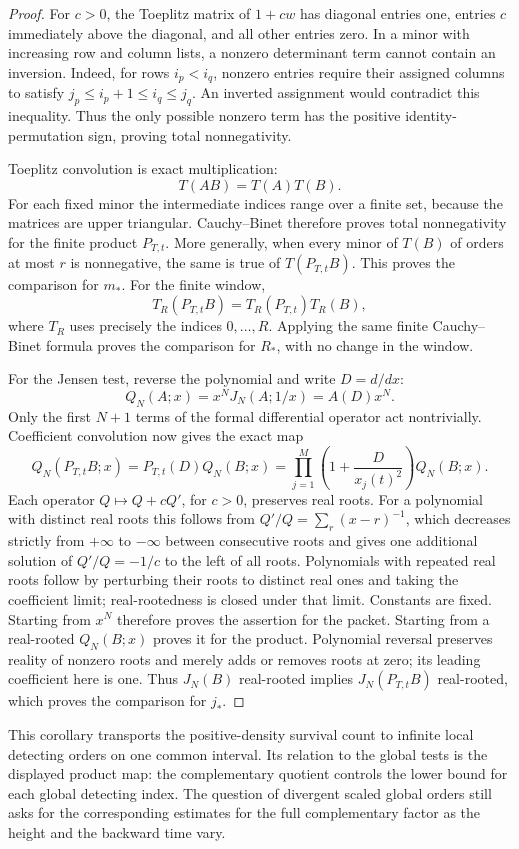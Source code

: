 \begin{proof}
For \(c>0\), the Toeplitz matrix of \(1+cw\) has diagonal entries
one, entries \(c\) immediately above the diagonal, and all other
entries zero. In a minor with increasing row and column lists, a
nonzero determinant term cannot contain an inversion. Indeed, for
rows \(i_p<i_q\), nonzero entries require their assigned columns to
satisfy \(j_p\le i_p+1\le i_q\le j_q\). An inverted assignment
would contradict this inequality. Thus the only possible nonzero
term has the positive identity-permutation sign, proving total
nonnegativity.

Toeplitz convolution is exact multiplication:
\[
 T(AB)=T(A)T(B).
\]
For each fixed minor the intermediate indices range over a finite
set, because the matrices are upper triangular. Cauchy--Binet
therefore proves total nonnegativity for the finite product
\(P_{T,t}\). More generally, when every minor of \(T(B)\) of orders
at most \(r\) is nonnegative, the same is true of \(T(P_{T,t}B)\).
This proves the comparison for \(m_*\). For the finite window,
\[
 T_R(P_{T,t}B)=T_R(P_{T,t})T_R(B),
\]
where \(T_R\) uses precisely the indices \(0,\ldots,R\).
Applying the same finite Cauchy--Binet formula proves the comparison
for \(R_*\), with no change in the window.

For the Jensen test, reverse the polynomial and write \(D=d/dx\):
\[
 Q_N(A;x)=x^N J_N(A;1/x)=A(D)x^N.
\]
Only the first \(N+1\) terms of the formal differential operator
act nontrivially. Coefficient convolution now gives the exact map
\[
 Q_N(P_{T,t}B;x)
   =P_{T,t}(D)Q_N(B;x)
   =\prod_{j=1}^{M}\left(1+\frac{D}{x_j(t)^2}\right)Q_N(B;x).
\]
Each operator \(Q\mapsto Q+cQ'\), for \(c>0\), preserves real
roots. For a polynomial with distinct real roots this follows from
\(Q'/Q=\sum_r(x-r)^{-1}\), which decreases strictly from
\(+\infty\) to \(-\infty\) between consecutive roots and gives
one additional solution of \(Q'/Q=-1/c\) to the left of all roots.
Polynomials with repeated real roots follow by perturbing their
roots to distinct real ones and taking the coefficient limit;
real-rootedness is closed under that limit. Constants are fixed.
Starting from \(x^N\) therefore proves the assertion for the packet.
Starting from a real-rooted \(Q_N(B;x)\) proves it for the product.
Polynomial reversal preserves reality of nonzero roots and merely
adds or removes roots at zero; its leading coefficient here is one.
Thus \(J_N(B)\) real-rooted implies \(J_N(P_{T,t}B)\) real-rooted,
which proves the comparison for \(j_*\).
\end{proof}

This corollary transports the positive-density survival count to
infinite local detecting orders on one common interval. Its relation
to the global tests is the displayed product map: the complementary
quotient controls the lower bound for each global detecting index.
The question of divergent scaled global orders still asks for the
corresponding estimates for the full complementary factor as the
height and the backward time vary.
